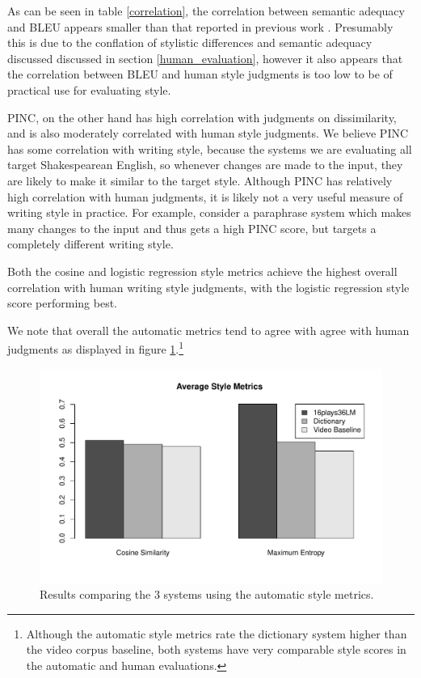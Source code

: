 \documentclass[10pt,a5paper,twoside]{article}
\begin{document}
As can be seen in table \ref{correlation}, the correlation between semantic adequacy and BLEU appears smaller than that reported in previous work \cite{chen11}.  Presumably this is
due to the conflation of stylistic differences and semantic adequacy discussed discussed in section \ref{human_evaluation}, however it also appears 
that the correlation between BLEU and human style judgments is too low to be of practical use for evaluating style.

PINC, on the other hand has high correlation with judgments on dissimilarity, and is also moderately correlated with human style
judgments.  We believe PINC has some correlation with writing style, because the systems we are evaluating all target Shakespearean English, 
so whenever changes are made to the input, they are likely to make it similar to the target style.
Although PINC has relatively high correlation with human judgments, it is likely not a very useful measure of writing style in practice.
For example, consider a paraphrase system which makes many changes to the input and thus gets a high PINC score, but targets a completely different writing style.

Both the cosine and logistic regression style metrics achieve the highest overall correlation with human writing style judgments, with the logistic regression style score performing best.

We note that overall the automatic metrics tend to agree with agree with human judgments as displayed in figure \ref{style_metrics}.\footnote{
  Although the automatic style metrics rate the dictionary system higher than the video corpus baseline, both systems have very comparable
  style scores in the automatic and human evaluations.
}

\begin{figure}
  \begin{center}
    \includegraphics[width=5in]{figures/style_metrics.pdf}
    \end{center}
    \caption{Results comparing the 3 systems using the automatic style metrics.}
    \label{style_metrics}
\end{figure}
\end{document}
